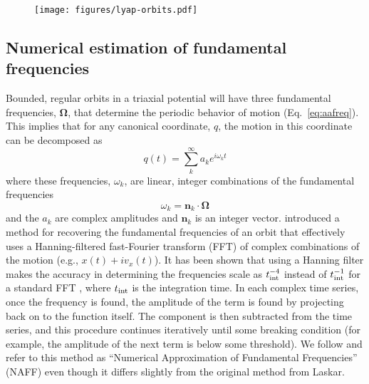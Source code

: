 \documentclass[letterpaper,12pt,preprint]{aastex}
\newcommand{\bs}[1]{\boldsymbol{#1}}
\newcommand{\inttime}{t_{\rm int}}
\begin{document}
\begin{figure}[!h]
\begin{center}
\texttt{[image: figures/lyap-orbits.pdf]}
\caption{ } \label{fig:lyap-orbits}
\end{center}
\end{figure}

\subsection{Numerical estimation of fundamental frequencies}\label{sec:naff}

Bounded, regular orbits in a triaxial potential will have three fundamental frequencies, $\bs{\Omega}$, that determine the periodic behavior of motion (Eq.~\ref{eq:aafreq}). This implies that for any canonical coordinate, $q$, the motion in this coordinate can be decomposed as 
\begin{equation}
	q(t) = \sum^\infty_k a_k e^{i \omega_k t}
\end{equation}
where these frequencies, $\omega_k$, are linear, integer combinations of the fundamental frequencies
\begin{equation}
	\omega_k = \bs{n}_k \cdot \bs{\Omega}
\end{equation}
and the $a_k$ are complex amplitudes and $\bs{n}_k$ is an integer vector. \cite{laskar93} introduced a method for recovering the fundamental frequencies of an orbit that effectively uses a Hanning-filtered fast-Fourier transform (FFT) of complex combinations of the motion (e.g., $x(t) + i v_x(t)$). It has been shown that using a Hanning filter makes the accuracy in determining the frequencies scale as $\inttime^{-4}$ instead of $\inttime^{-1}$ for a standard FFT \citep{laskar99}, where $\inttime$ is the integration time. In each complex time series, once the frequency is found, the amplitude of the term is found by projecting back on to the function itself. The component is then subtracted from the time series, and this procedure continues iteratively until some breaking condition (for example, the amplitude of the next term is below some threshold). We follow \cite{valluri98} and refer to this method as ``Numerical Approximation of Fundamental Frequencies'' (NAFF) even though it differs slightly from the original method from Laskar.
\end{document}
